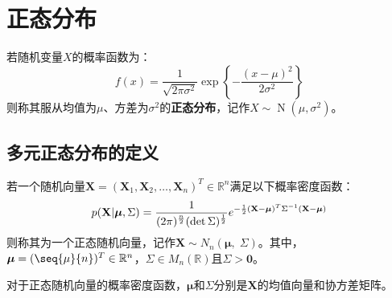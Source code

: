 \section{正态分布}
\begin{definition}
	若随机变量$X$的概率函数为：
	\begin{equation*}
		f(x)=\frac{1}{\sqrt{2\pi\sigma^2}}\exp\left\{-\frac{(x-\mu)^2}{2\sigma^2}\right\}
	\end{equation*}
	则称其服从均值为$\mu$、方差为$\sigma^2$的\textbf{正态分布}，记作$X\sim\operatorname{N}(\mu,\sigma^2)$。
\end{definition}
\subsection{多元正态分布的定义}
\begin{definition}\label{def:MultiNormal1}
	若一个随机向量$\mathbf{X}=(\mathbf{X}_1,\mathbf{X}_2,\dots,\mathbf{X}_n)^T\in\mathbb{R}^n$满足以下概率密度函数：
	\begin{equation}
		p(\mathbf{X}|\boldsymbol{\mu},\Sigma)=\frac{1}{(2\pi)^{\frac{n}{2}}(\det\Sigma)^{\frac{1}{2}}}e^{-\frac{1}{2}(\mathbf{X}-\boldsymbol{\mu})^T\Sigma^{-1}(\mathbf{X}-\boldsymbol{\mu})}\notag
	\end{equation}
	则称其为一个正态随机向量，记作$\mathbf{X}\sim N_n(\boldsymbol{\mu},\;\Sigma)$。其中，$\boldsymbol{\mu}=(\seq{\mu}{n})^T\in\mathbb{R}^{n}$，$\Sigma\in M_{n}(\mathbb{R})$且$\Sigma>\mathbf{0}$。
\end{definition}
\begin{theorem}
	对于正态随机向量的概率密度函数，$\boldsymbol{\mu}$和$\Sigma$分别是$\mathbf{X}$的均值向量和协方差矩阵。
\end{theorem}
